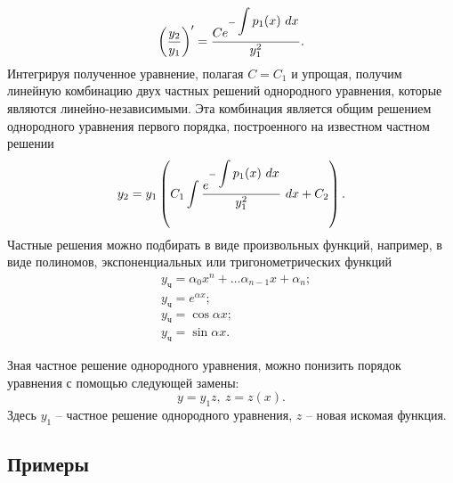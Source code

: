     \[
        \left( \dfrac{y_2}{y_1} \right)' = \dfrac{C e^{-\displaystyle\int p_1(x) ~ dx}}{y^2_1}.
    \]
    Интегрируя полученное уравнение, полагая $ C = C_1 $ и упрощая, получим линейную комбинацию двух частных решений однородного уравнения, которые являются линейно-независимыми. Эта комбинация является общим решением однородного уравнения первого порядка, построенного на известном частном решении
    \[
        y_2 = y_1 \left( C_1 \int \dfrac{e^{-\displaystyle\int p_1(x) ~ dx}}{y^2_1} ~ dx + C_2 \right).
    \]
    Частные решения можно подбирать в виде произвольных функций, например, в виде полиномов, экспоненциальных или тригонометрических функций
    \[
        \begin{split}
            &y_\text{ч} = \alpha_0 x^n + \dots \alpha_{n - 1} x + \alpha_n; \\
            &y_\text{ч} = e^{\alpha x}; \\
            &y_\text{ч} = \cos{\alpha x}; \\
            &y_\text{ч} = \sin{\alpha x}.
        \end{split}
    \]

    Зная частное решение однородного уравнения, можно понизить порядок уравнения с помощью следующей замены:
    \[
        y = y_1 z, ~ z = z(x).
    \]
    Здесь $ y_1 $ -- частное решение однородного уравнения, $ z $ -- новая искомая функция.


    \subsection{Примеры}

